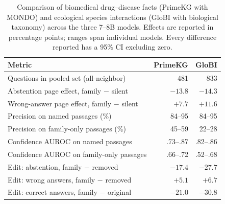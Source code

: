 \begin{table}[t]
\centering
\footnotesize
\setlength{\tabcolsep}{2.6pt}
\begin{tabular}{lrr}
\toprule
Metric & PrimeKG & GloBI \\
\midrule
Questions in pooled set (all-neighbor) & 481 & 833 \\
Abstention page effect, family $-$ silent & $-13.8$ & $-14.3$ \\
Wrong-answer page effect, family $-$ silent & $+7.7$ & $+11.6$ \\
Precision on named passages (\%) & 84--95 & 84--95 \\
Precision on family-only passages (\%) & 45--59 & 22--28 \\
Confidence AUROC on named passages & .73--.87 & .82--.86 \\
Confidence AUROC on family-only passages & .66--.72 & .52--.68 \\
Edit: abstention, family $-$ removed & $-17.4$ & $-27.7$ \\
Edit: wrong answers, family $-$ removed & $+5.1$ & $+6.7$ \\
Edit: correct answers, family $-$ original & $-21.0$ & $-30.8$ \\
\bottomrule
\end{tabular}
\caption{Comparison of biomedical drug--disease facts (PrimeKG with MONDO) and ecological species interactions (GloBI with biological taxonomy) across the three 7--8B models. Effects are reported in percentage points; ranges span individual models. Every difference reported has a 95\% CI excluding zero.}
\label{tab:globi}
\end{table}